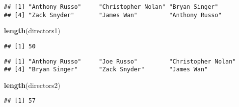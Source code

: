 \documentclass[]{article}
\newenvironment{Shaded}{\begin{snugshade}}{\end{snugshade}}
\newcommand{\KeywordTok}[1]{\textcolor[rgb]{0.13,0.29,0.53}{\textbf{#1}}}
\newcommand{\NormalTok}[1]{#1}
\newcommand{\OperatorTok}[1]{\textcolor[rgb]{0.81,0.36,0.00}{\textbf{#1}}}
\newcommand{\StringTok}[1]{\textcolor[rgb]{0.31,0.60,0.02}{#1}}
\begin{document}
\begin{Shaded}
\end{Shaded}

\begin{verbatim}
## [1] "Anthony Russo"     "Christopher Nolan" "Bryan Singer"     
## [4] "Zack Snyder"       "James Wan"         "Anthony Russo"
\end{verbatim}

\begin{Shaded}
\begin{Highlighting}[]
\KeywordTok{length}\NormalTok{(directors1)}
\end{Highlighting}
\end{Shaded}

\begin{verbatim}
## [1] 50
\end{verbatim}

\begin{Shaded}
\end{Shaded}

\begin{verbatim}
## [1] "Anthony Russo"     "Joe Russo"         "Christopher Nolan"
## [4] "Bryan Singer"      "Zack Snyder"       "James Wan"
\end{verbatim}

\begin{Shaded}
\begin{Highlighting}[]
\KeywordTok{length}\NormalTok{(directors2)}
\end{Highlighting}
\end{Shaded}

\begin{verbatim}
## [1] 57
\end{verbatim}
\end{document}
